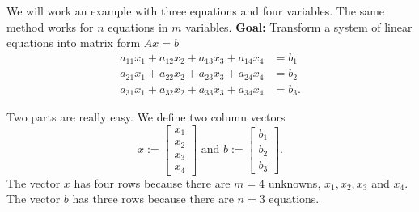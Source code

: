 \begin{tcolorbox}[sharp corners, colback=green!30, colframe=green!80!blue, title={\bf \Large From Multiple Linear Equations to Matrices and Vectors}]
We will work an example with three equations and four variables. The same method works for $n$ equations in $m$ variables. \textbf{Goal:} Transform a system of linear equations into matrix form $Ax = b$
\begin{equation}
\label{eq:3Eqns4unknowns}
\begin{aligned}
a_{11} x_1+ a_{12}x_2 + a_{13}x_3 + a_{14}x_4&=b_1 \\
a_{21} x_1+ a_{22}x_2 + a_{23}x_3 + a_{24}x_4&=b_2 \\
a_{31} x_1+ a_{32}x_2 + a_{33}x_3 + a_{34}x_4&=b_3.
\end{aligned}
\end{equation}

Two parts are really easy. We define two column vectors
\begin{equation}
    \label{eq:DefinexDefineb}
    x :=\begin{bmatrix} x_1 \\ x_2 \\x_3 \\x_4\end{bmatrix}\text{ and }  b :=\begin{bmatrix} b_1 \\ b_2 \\b_3 \end{bmatrix}.
\end{equation}
The vector $x$ has four rows because there are $m=4$ unknowns, $x_1, x_2, x_3$ and $x_4$. The vector $b$ has three rows because there are $n=3$ equations.\\


\end{tcolorbox}

